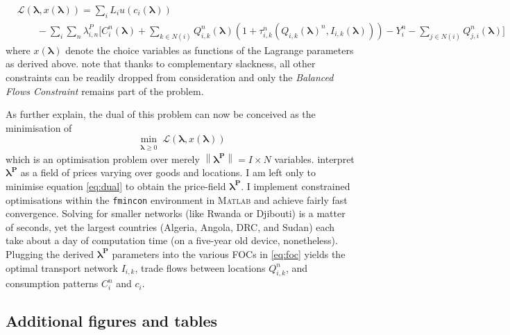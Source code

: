 \documentclass[11pt, oneside]{article}   	%
\begin{document}
\begin{spacing}{1.3}
\begin{equation}
  \label{eq:dual}
  \begin{aligned}
    & \mathcal{L}(\bm{\lambda}, x(\bm{\lambda})) = \sum_{i}^{} L_{i}u(c_{i}(\bm{\lambda})) \\
  & \qquad - \sum_{i}^{}\sum_{n}^{}\lambda^{P}_{i,n}\bigg[ C_{i}^{n}(\bm{\lambda}) + \sum_{k\in N(i)}^{}Q_{i,k}^{n}(\bm{\lambda})(1+\tau_{i,k}^{n}(Q_{i,k}(\bm{\lambda})^{n}, I_{i,k}(\bm{\lambda}))) - Y_{i}^{n} - \sum_{j\in N(i)}^{}Q_{j,i}^{n}(\bm{\lambda}) \bigg]
  \end{aligned}
\end{equation}
where $x(\bm{\lambda})$ denote the choice variables as functions of the Lagrange parameters as derived above. \citeauthor{Fajgelbaum_OptimalTransportNetworks_2017} note that thanks to complementary slackness, all other constraints can be readily dropped from consideration and only the \emph{Balanced Flows Constraint} remains part of the problem.

As \citeauthor{Fajgelbaum_OptimalTransportNetworks_2017} further explain, the dual of this problem can now be conceived as the minimisation of
\begin{equation*}
  \!\min_{\substack{\bm{\lambda} \geq 0}}\mathcal{L}(\bm{\lambda}, x(\bm{\lambda}))
\end{equation*}
which is an optimisation problem over merely $\left\lVert\bm{\lambda^{P}}\right\rVert = I \times N$ variables. \citeauthor{Fajgelbaum_OptimalTransportNetworks_2017} interpret $\bm{\lambda^{P}}$ as a field of prices varying over goods and locations. I am left only to minimise equation \eqref{eq:dual} to obtain the price-field $\bm{\lambda^{P}}$. I implement constrained optimisations within the \texttt{fmincon} environment in \textsc{Matlab} and achieve fairly fast convergence. Solving for smaller networks (like Rwanda or Djibouti) is a matter of seconds, yet the largest countries (Algeria, Angola, DRC, and Sudan) each take about a day of computation time (on a five-year old device, nonetheless). Plugging the derived $\bm{\lambda^{P}}$ parameters into the various FOCs in \eqref{eq:foc} yields the optimal transport network $I_{i,k}$, trade flows between locations $Q_{i,k}^{n}$, and consumption patterns $C_{i}^{n}$ and $c_{i}$.

\vfill
  \subsection{Additional figures and tables}



\end{spacing}
\end{document}
